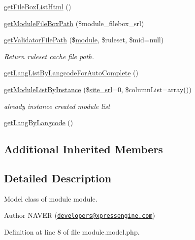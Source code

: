 \begin{DoxyCompactItemize}
\item 
\hyperlink{classmoduleModel_acf3405bfe791d8bf7d8e7886b9481923}{get\-File\-Box\-List\-Html} ()
\item 
\hyperlink{classmoduleModel_ac1183d568d6dab443a83c8618e6eb348}{get\-Module\-File\-Box\-Path} (\$module\-\_\-filebox\-\_\-srl)
\item 
\hyperlink{classmoduleModel_a240b4774ddaadc1ded08551120942ca3}{get\-Validator\-File\-Path} (\$\hyperlink{classmodule}{module}, \$ruleset, \$mid=null)
\begin{DoxyCompactList}\small\item\em Return ruleset cache file path. \end{DoxyCompactList}\item 
\hyperlink{classmoduleModel_aa0e34c0fdc868595793b10b6b4534c74}{get\-Lang\-List\-By\-Langcode\-For\-Auto\-Complete} ()
\item 
\hyperlink{classmoduleModel_a29d890e1acd36f429ff2411533104c8b}{get\-Module\-List\-By\-Instance} (\$\hyperlink{ko_8install_8php_a8b1406b4ad1048041558dce6bfe89004}{site\-\_\-srl}=0, \$column\-List=array())
\begin{DoxyCompactList}\small\item\em already instance created module list \end{DoxyCompactList}\item 
\hyperlink{classmoduleModel_a4ea7187b04b26a98fe6d7fd138817b16}{get\-Lang\-By\-Langcode} ()
\end{DoxyCompactItemize}
\subsection*{Additional Inherited Members}


\subsection{Detailed Description}
Model class of module module. 

\begin{DoxyAuthor}{Author}
N\-A\-V\-E\-R (\href{mailto:developers@xpressengine.com}{\tt developers@xpressengine.\-com}) 
\end{DoxyAuthor}


Definition at line 8 of file module.\-model.\-php.



